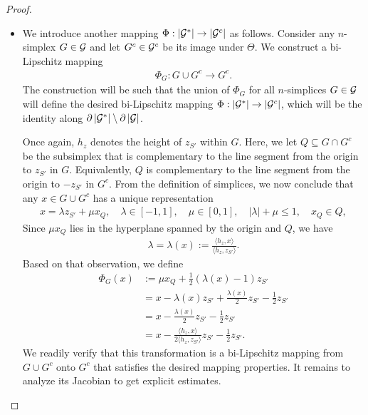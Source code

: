 \documentclass[10pt,a4paper]{article}
\begin{document}
\begin{proof}
\begin{itemize}
        
        
        
        
        \item 
        We introduce another mapping $\Phi : \left| {\mathcal G}^\ast \right| \rightarrow \left| {\mathcal G}^{c} \right|$ as follows. 
        Consider any $n$-simplex $G \in {\mathcal G}$ and let $G^c \in {\mathcal G}^{c}$ be its image under $\Theta$.
        We construct a bi-Lipschitz mapping 
        \begin{align*}
            \Phi_{G} : G \cup G^{c} \rightarrow G^{c}.
        \end{align*}
        The construction will be such that the union of $\Phi_{G}$ for all $n$-simplices $G \in {\mathcal G}$
        will define the desired bi-Lipschitz mapping $\Phi : \left| {\mathcal G}^\ast \right| \rightarrow \left| {\mathcal G}^{c} \right|$,
        which will be the identity along $\partial\left| {\mathcal G}^\ast \right| \setminus \partial\left| {\mathcal G} \right|$.
        
        Once again, $h_{z}$ denotes the height of $z_{S'}$ within $G$.
        Here, we let $Q \subseteq G \cap G^{c}$ be the subsimplex 
        that is complementary to the line segment from the origin to $z_{S'}$ in $G$.
        Equivalently, $Q$ is complementary to the line segment from the origin to $-z_{S'}$ in $G^{c}$.
        From the definition of simplices, we now conclude that any $x \in G \cup G^{c}$ 
        has a unique representation
        \begin{align*}
            x = \lambda z_{S'} + \mu x_{Q}, \quad \lambda \in [-1,1], \quad \mu \in [0,1], \quad |\lambda| + \mu \leq 1, \quad x_{Q} \in Q,
        \end{align*}
        Since $\mu x_{Q}$ lies in the hyperplane spanned by the origin and $Q$, we have 
        \begin{align*}
            \lambda = \lambda(x) := \frac{\langle h_{z},x\rangle}{\langle h_{z},z_{S'}\rangle} 
            .
        \end{align*}
        Based on that observation, we define 
        \begin{align*}
            \Phi_{G}(x) %
            &
            := 
            \mu x_{Q} + \frac 1 2 \left( \lambda(x) - 1 \right) z_{S'}
            \\&
            = 
            x - \lambda(x) z_{S'} + \frac{ \lambda(x)}{ 2 } z_{S'} - \frac{ 1 }{ 2 } z_{S'}
            \\&
            = 
            x - \frac{ \lambda(x) }{2} z_{S'} - \frac{ 1 }{ 2 } z_{S'}
            \\&
            = 
            x - \frac{\langle h_{z},x\rangle}{2\langle h_{z},z_{S'}\rangle} z_{S'} - \frac 1 2 z_{S'}
            .
        \end{align*}
        We readily verify that this transformation is a bi-Lipschitz mapping from $G \cup G^{c}$ onto $G^{c}$
        that satisfies the desired mapping properties. 
        It remains to analyze its Jacobian to get explicit estimates. 
        

\end{itemize}
\end{proof}
\end{document}
